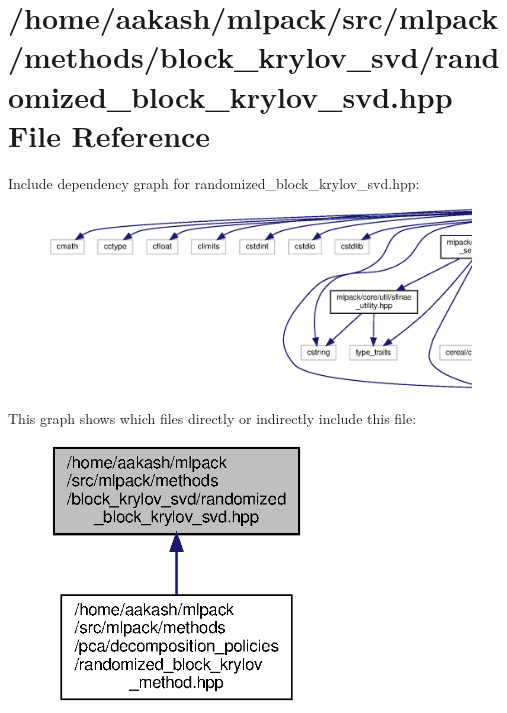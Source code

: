 \section{/home/aakash/mlpack/src/mlpack/methods/block\+\_\+krylov\+\_\+svd/randomized\+\_\+block\+\_\+krylov\+\_\+svd.hpp File Reference}
\label{randomized__block__krylov__svd_8hpp}
Include dependency graph for randomized\+\_\+block\+\_\+krylov\+\_\+svd.\+hpp\+:
\nopagebreak
\begin{figure}[H]
\begin{center}
\leavevmode
\includegraphics[width=350pt]{randomized__block__krylov__svd_8hpp__incl}
\end{center}
\end{figure}
This graph shows which files directly or indirectly include this file\+:
\nopagebreak
\begin{figure}[H]
\begin{center}
\leavevmode
\includegraphics[width=193pt]{randomized__block__krylov__svd_8hpp__dep__incl}
\end{center}
\end{figure}
